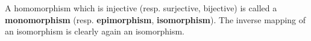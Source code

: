 A homomorphism which is injective (resp. surjective, bijective) is called a \textbf{monomorphism} (resp. \textbf{epimorphism}, \textbf{isomorphism}). The inverse mapping of an isomorphism is clearly again an isomorphism.
